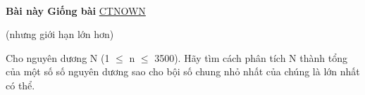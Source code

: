  

\textbf{Bài này Giống bài }\href{http://vnoi.info/problems/show/CTNOWN/}{CTNOWN}

(nhưng giới hạn lớn hơn)

Cho nguyên dương N (1 $\le$ n $\le$ 3500). Hãy tìm cách phân tích N thành tổng của một số số nguyên dương sao cho bội số chung nhỏ nhất của chúng là lớn nhất có thể.